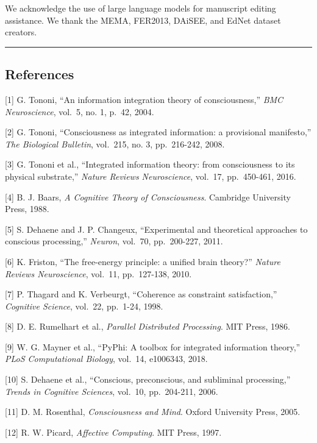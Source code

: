 \documentclass[
]{article}
\begin{document}
We acknowledge the use of large language models for manuscript editing
assistance. We thank the MEMA, FER2013, DAiSEE, and EdNet dataset
creators.

\begin{center}\rule{0.5\linewidth}{0.5pt}\end{center}

\subsection{References}\label{references}

{[}1{]} G. Tononi, ``An information integration theory of
consciousness,'' \emph{BMC Neuroscience}, vol.~5, no. 1, p.~42, 2004.

{[}2{]} G. Tononi, ``Consciousness as integrated information: a
provisional manifesto,'' \emph{The Biological Bulletin}, vol.~215, no.
3, pp.~216-242, 2008.

{[}3{]} G. Tononi et al., ``Integrated information theory: from
consciousness to its physical substrate,'' \emph{Nature Reviews
Neuroscience}, vol.~17, pp.~450-461, 2016.

{[}4{]} B. J. Baars, \emph{A Cognitive Theory of Consciousness}.
Cambridge University Press, 1988.

{[}5{]} S. Dehaene and J. P. Changeux, ``Experimental and theoretical
approaches to conscious processing,'' \emph{Neuron}, vol.~70,
pp.~200-227, 2011.

{[}6{]} K. Friston, ``The free-energy principle: a unified brain
theory?'' \emph{Nature Reviews Neuroscience}, vol.~11, pp.~127-138,
2010.

{[}7{]} P. Thagard and K. Verbeurgt, ``Coherence as constraint
satisfaction,'' \emph{Cognitive Science}, vol.~22, pp.~1-24, 1998.

{[}8{]} D. E. Rumelhart et al., \emph{Parallel Distributed Processing}.
MIT Press, 1986.

{[}9{]} W. G. Mayner et al., ``PyPhi: A toolbox for integrated
information theory,'' \emph{PLoS Computational Biology}, vol.~14,
e1006343, 2018.

{[}10{]} S. Dehaene et al., ``Conscious, preconscious, and subliminal
processing,'' \emph{Trends in Cognitive Sciences}, vol.~10, pp.~204-211,
2006.

{[}11{]} D. M. Rosenthal, \emph{Consciousness and Mind}. Oxford
University Press, 2005.

{[}12{]} R. W. Picard, \emph{Affective Computing}. MIT Press, 1997.
\end{document}
